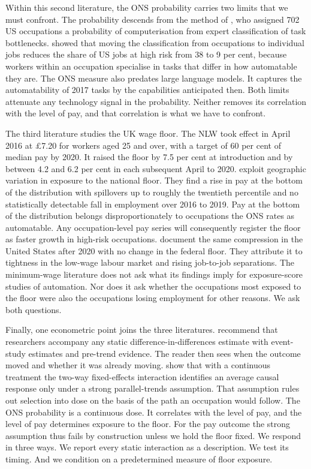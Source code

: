 \documentclass[12pt,leqno]{article}
\begin{document}
Within this second literature, the ONS probability carries two limits that we must confront. The probability descends from the method of \citet{frey2017future}, who assigned 702 US occupations a probability of computerisation from expert classification of task bottlenecks. \citet{arntz2017revisiting} showed that moving the classification from occupations to individual jobs reduces the share of US jobs at high risk from 38 to 9 per cent, because workers within an occupation specialise in tasks that differ in how automatable they are. The ONS measure also predates large language models. It captures the automatability of 2017 tasks by the capabilities anticipated then. Both limits attenuate any technology signal in the probability. Neither removes its correlation with the level of pay, and that correlation is what we have to confront.

The third literature studies the UK wage floor. The NLW took effect in April 2016 at \pounds 7.20 for workers aged 25 and over, with a target of 60 per cent of median pay by 2020. It raised the floor by 7.5 per cent at introduction and by between 4.2 and 6.2 per cent in each subsequent April to 2020. \citet{giupponi2024minimum} exploit geographic variation in exposure to the national floor. They find a rise in pay at the bottom of the distribution with spillovers up to roughly the twentieth percentile and no statistically detectable fall in employment over 2016 to 2019. Pay at the bottom of the distribution belongs disproportionately to occupations the ONS rates as automatable. Any occupation-level pay series will consequently register the floor as faster growth in high-risk occupations. \citet{autor2023compression} document the same compression in the United States after 2020 with no change in the federal floor. They attribute it to tightness in the low-wage labour market and rising job-to-job separations. The minimum-wage literature does not ask what its findings imply for exposure-score studies of automation. Nor does it ask whether the occupations most exposed to the floor were also the occupations losing employment for other reasons. We ask both questions.

Finally, one econometric point joins the three literatures. \citet{roth2023trending} recommend that researchers accompany any static difference-in-differences estimate with event-study estimates and pre-trend evidence. The reader then sees when the outcome moved and whether it was already moving. \citet{callaway2024continuous} show that with a continuous treatment the two-way fixed-effects interaction identifies an average causal response only under a strong parallel-trends assumption. That assumption rules out selection into dose on the basis of the path an occupation would follow. The ONS probability is a continuous dose. It correlates with the level of pay, and the level of pay determines exposure to the floor. For the pay outcome the strong assumption thus fails by construction unless we hold the floor fixed. We respond in three ways. We report every static interaction as a description. We test its timing. And we condition on a predetermined measure of floor exposure.
\end{document}
